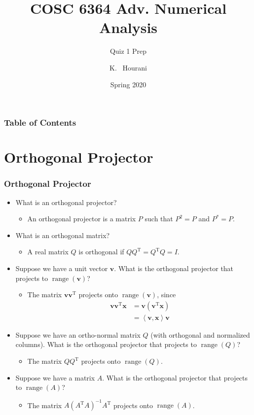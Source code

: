 \documentclass[10pt]{beamer}
\title[COSC6364 Adv. Numerical Analysis] %
{COSC 6364 Adv. Numerical Analysis}
\subtitle{Quiz 1 Prep}
\author[Khalid Hourani] %
{K. ~Hourani\inst{1}}
\institute[VFU] %
{
  \inst{1}%
  Computer Science\\
  University of Houston
}
\date[Spring 2020] %
{Spring 2020}
\renewcommand{\vec}[1]{\boldsymbol{#1}}
\newcommand{\dotprod}[2]{\left\langle#1,#2\right\rangle}
\newcommand{\T}{\mathrm{T}}
\newcommand{\range}[1]{\operatorname{range}\left(#1\right)}
\newcommand{\subitem}[1]{\begin{itemize}\item #1\end{itemize}}
\begin{document}
\frame{\titlepage}

\begin{frame}
  \frametitle{Table of Contents}
  \tableofcontents
\end{frame}

\section{Orthogonal Projector}
\begin{frame}
  \frametitle{Orthogonal Projector}
  \begin{itemize}[<+->]
    \item What is an orthogonal projector?
    \subitem{An orthogonal projector is a matrix \(P\) such that \(P^2 = P\) and \(P^*=P\).}
    \item What is an orthogonal matrix?
    \subitem{A real matrix \(Q\) is orthogonal if \(QQ^{\T} = Q^{\T}Q=I\).}
    \item Suppose we have a unit vector \(\vec{v}\). What is the orthogonal projector that projects to \(\range{\vec{v}}\)?
    \subitem{The matrix \(\vec{v}\vec{v}^{\T}\) projects onto \(\range{\vec{v}}\), since \begin{align*}\vec{v}\vec{v}^{\T}\vec{x}&=\vec{v}\left(\vec{v}^{\T}\vec{x}\right)\\&=\dotprod{\vec{v}}{\vec{x}}\vec{v}\end{align*}\vspace{-5mm}}
    \item Suppose we have an ortho-normal matrix \(Q\) (with orthogonal and normalized columns). What is the orthogonal projector that projects to \(\range{Q}\)?
    \subitem{The matrix \(QQ^{\T}\) projects onto \(\range{Q}\).}
    \item Suppose we have a matrix \(A\). What is the orthogonal projector that projects to \(\range{A}\)?
    \subitem{The matrix \(A(A^{\T}A)^{-1}A^{\T}\) projects onto \(\range{A}\).}
  \end{itemize}
\end{frame}
\end{document}
